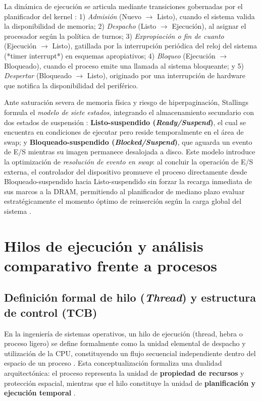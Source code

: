 \documentclass[12pt]{article}
\begin{document}
La dinámica de ejecución se articula mediante transiciones gobernadas por el planificador del kernel \parencite[\S 3.2, p.\ 134]{stallings2018operating}: 1) \textit{Admisión} (Nuevo $\to$ Listo), cuando el sistema valida la disponibilidad de memoria; 2) \textit{Despacho} (Listo $\to$ Ejecución), al asignar el procesador según la política de turnos; 3) \textit{Expropiación o fin de cuanto} (Ejecución $\to$ Listo), gatillada por la interrupción periódica del reloj del sistema (*timer interrupt*) en esquemas apropiativos; 4) \textit{Bloqueo} (Ejecución $\to$ Bloqueado), cuando el proceso emite una llamada al sistema bloqueante; y 5) \textit{Despertar} (Bloqueado $\to$ Listo), originado por una interrupción de hardware que notifica la disponibilidad del periférico.

Ante saturación severa de memoria física y riesgo de hiperpaginación, Stallings formula el \textit{modelo de siete estados}, integrando el almacenamiento secundario con dos estados de suspensión \parencite[\S 3.2, p.\ 138]{stallings2018operating}: \textbf{Listo-suspendido (\textit{Ready/Suspend})}, el cual se encuentra en condiciones de ejecutar pero reside temporalmente en el área de swap; y \textbf{Bloqueado-suspendido (\textit{Blocked/Suspend})}, que aguarda un evento de E/S mientras su imagen permanece desalojada a disco. Este modelo introduce la optimización de \textit{resolución de evento en swap}: al concluir la operación de E/S externa, el controlador del dispositivo promueve el proceso directamente desde Bloqueado-suspendido hacia Listo-suspendido sin forzar la recarga inmediata de sus marcos a la DRAM, permitiendo al planificador de mediano plazo evaluar estratégicamente el momento óptimo de reinserción según la carga global del sistema \parencite[\S 3.2, p.\ 140]{stallings2018operating}.

\clearpage

\section{Hilos de ejecución y análisis comparativo frente a procesos}

\subsection{Definición formal de hilo (\textit{Thread}) y estructura de control (TCB)}

En la ingeniería de sistemas operativos, un hilo de ejecución (thread, hebra o proceso ligero) se define formalmente como la unidad elemental de despacho y utilización de la CPU, constituyendo un flujo secuencial independiente dentro del espacio de un proceso \parencite[\S 4.1, p.\ 111]{silberschatz2006fundamentos}. Esta conceptualización formaliza una dualidad arquitectónica: el proceso representa la unidad de \textbf{propiedad de recursos} y protección espacial, mientras que el hilo constituye la unidad de \textbf{planificación y ejecución temporal} \parencite[\S 4.1, p.\ 177]{stallings2018operating}.
\end{document}
